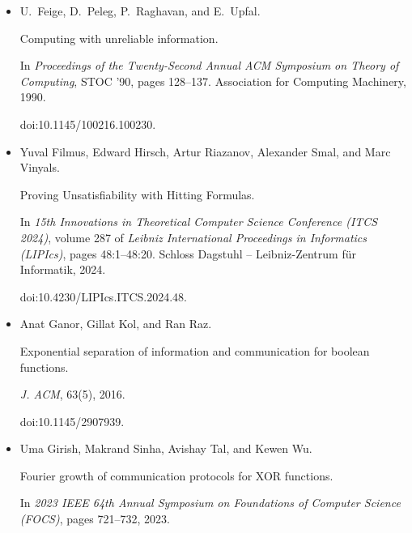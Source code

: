 \documentclass[10pt,a4paper]{article}
\begin{document}
\begin{itemize}
Tomás Feder, Eyal Kushilevitz, Moni Naor, and Noam Nisan.


Amortized communication complexity.


\emph{SIAM Journal on Computing}, 24(4):736–750, 1995.


doi:10.1137/S0097539792235864.





\item[] 
[24]

U. Feige, D. Peleg, P. Raghavan, and E. Upfal.


Computing with unreliable information.


In \emph{Proceedings of the Twenty-Second Annual ACM Symposium on
Theory of Computing}, STOC ’90, pages 128–137. Association for Computing
Machinery, 1990.


doi:10.1145/100216.100230.





\item[] 
[25]

Yuval Filmus, Edward Hirsch, Artur Riazanov, Alexander Smal, and Marc Vinyals.


Proving Unsatisfiability with Hitting Formulas.


In \emph{15th Innovations in Theoretical Computer Science Conference
(ITCS 2024)}, volume 287 of \emph{Leibniz International Proceedings in
Informatics (LIPIcs)}, pages 48:1–48:20. Schloss Dagstuhl – Leibniz-Zentrum
für Informatik, 2024.


doi:10.4230/LIPIcs.ITCS.2024.48.





\item[] 
[26]

Anat Ganor, Gillat Kol, and Ran Raz.


Exponential separation of information and communication for boolean
functions.


\emph{J. ACM}, 63(5), 2016.


doi:10.1145/2907939.





\item[] 
[27]

Uma Girish, Makrand Sinha, Avishay Tal, and Kewen Wu.


Fourier growth of communication protocols for XOR functions.


In \emph{2023 IEEE 64th Annual Symposium on Foundations of Computer
Science (FOCS)}, pages 721–732, 2023.



\end{itemize}
\end{document}
